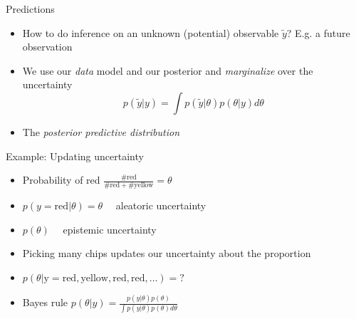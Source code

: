 \documentclass[10pt]{beamer}
\begin{document}
\begin{frame}{Predictions}
  \begin{itemize}
  \item How to do inference on an unknown (potential) observable $\tilde{y}$? E.g. a future observation
  \pause
  \item We use our \emph{data} model and our posterior and \emph{marginalize} over the uncertainty
  \[
  p(\tilde{y}|y) = \int p(\tilde{y}|\theta) p(\theta|y) d\theta
  \]
  \item The \emph{posterior predictive distribution}
  \end{itemize}
\end{frame}


\begin{frame}{Example: Updating uncertainty}

  \begin{itemize}
  \item<2-> Probability of red $\frac{\mathrm{\#red}}{\mathrm{\#red+\#yellow}}=\theta$
    \vspace{\baselineskip}
  \item<3-> $p(y=\mathrm{red}|\theta)=\theta \quad$ aleatoric uncertainty
    \vspace{\baselineskip}
  \item<4-> $p(\theta) \quad$ epistemic uncertainty
    \vspace{\baselineskip}
  \item<5-> Picking many chips updates our uncertainty about the proportion
    \vspace{\baselineskip}
  \item<5-> $p(\theta|\mathrm{y=red,yellow,red,red,\ldots})=?$
    \vspace{\baselineskip}
  \item<6-> Bayes rule
      $p(\theta|y)=\frac{p(y|\theta)p(\theta)}{\int p(y|\theta)p(\theta) d\theta}$
  \end{itemize}
\end{frame}
\end{document}
